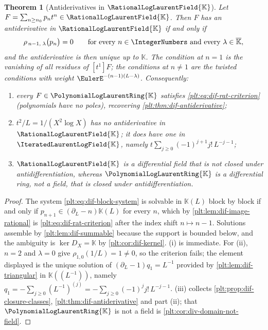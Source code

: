 \documentclass[11pt,oneside]{article}
\theoremstyle{plain}
\newtheorem{theorem}{Theorem}[section]
\theoremstyle{definition}
\theoremstyle{remark}
\newcommand{\K}{\mathbb{K}}
\newcommand{\PLlau}{\PolynomialLogLaurentRing{\K}}       %
\newcommand{\PLrat}{\RationalLogLaurentField{\K}}        %
\newcommand{\PLit}{\IteratedLaurentLogField{\K}}         %
\newcommand{\DX}{D_{X}}                                  %
\begin{document}
\begin{theorem}[Antiderivatives in \(\PLrat\)]\label{plt:thm:dif-anti-rat}
Let \(F=\sum_{n\ge n_{0}}p_{n}t^{n}\in\PLrat\).  Then \(F\) has an
antiderivative in \(\PLrat\) if and only if
\begin{equation}\label{plt:eq:dif-rat-criterion}
  \rho_{\,n-1,\;\lambda}\bigl(p_{n}\bigr)=0
  \qquad\text{for every }n\in\IntegerNumbers
  \text{ and every }\lambda\in\overline{\K},
\end{equation}
and the antiderivative is then unique up to \(\K\).  The condition at \(n=1\)
is the vanishing of all residues of \([t^{1}]F\); the conditions at
\(n\ne1\) are the twisted conditions with weight
\(\EulerE^{-(n-1)(L-\lambda)}\).  Consequently:
\begin{enumerate}
\item every \(F\in\PLlau\) satisfies \cref{plt:eq:dif-rat-criterion}
      (polynomials have no poles), recovering
      \cref{plt:thm:dif-antiderivative};
\item \(t^{2}/L=1/(X^{2}\log X)\) has no antiderivative in \(\PLrat\); it does
      have one in \(\PLit\), namely
      \(t\sum_{j\ge0}(-1)^{j+1}j!\,L^{-j-1}\);
\item \(\PLrat\) is a differential field that is not closed under
      antidifferentiation, whereas \(\PLlau\) is a differential ring, not a
      field, that is closed under antidifferentiation.
\end{enumerate}
\end{theorem}

\begin{proof}
The system \cref{plt:eq:dif-block-system} is solvable in \(\K(L)\) block by
block if and only if \(p_{n+1}\in(\partial_{L}-n)\K(L)\) for every \(n\), which
by \cref{plt:lem:dif-image-rational} is \cref{plt:eq:dif-rat-criterion} after
the index shift \(n\mapsto n-1\).  Solutions assemble by
\cref{plt:lem:dif-summable} because the support is bounded below, and the
ambiguity is \(\ker\DX=\K\) by \cref{plt:cor:dif-kernel}.  (i) is immediate.
For (ii), \(n=2\) and \(\lambda=0\) give \(\rho_{1,0}(1/L)=1\ne0\), so the
criterion fails; the element displayed is the unique solution of
\((\partial_{L}-1)q_{1}=L^{-1}\) provided by
\cref{plt:lem:dif-triangular} in \(\K((L^{-1}))\), namely
\(q_{1}=-\sum_{j\ge0}(L^{-1})^{(j)}=-\sum_{j\ge0}(-1)^{j}j!\,L^{-j-1}\).
(iii) collects \cref{plt:prop:dif-closure-classes},
\cref{plt:thm:dif-antiderivative} and part (ii); that \(\PLlau\) is not a
field is \cref{plt:cor:div-domain-not-field}.
\end{proof}
\end{document}
